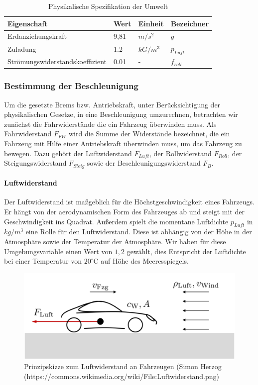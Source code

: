 \documentclass[12pt,a4paper,bibliography=totocnumbered,listof=totocnumbered, abstracton]{scrartcl}
\theoremstyle{Umgebung}
\begin{document}
\begin{table}[]
	\centering
	\caption{Physikalische Spezifikation der Umwelt}
	\label{table:physics}
	\begin{tabular}{@{}llll@{}}
		\toprule
		Eigenschaft                     & Wert & Einheit & Bezeichner           \\ \midrule
		Erdanziehungskraft	            & 9,81 & $m/s^2$    & $g$            \\
		Zuladung                        & 1.2  & $kG/m^3$   & $p_{Luft}$             \\
		Strömungswiderstandskoeffizient & 0.01 & -       & $f_{roll}$                 \\ \bottomrule       
	\end{tabular}
\end{table}

\subsubsection{Bestimmung der Beschleunigung}

Um die gesetzte Brems bzw. Antriebskraft, unter Berücksichtigung der physikalischen Gesetze, in eine Beschleunigung umzurechnen, betrachten wir zunächst die Fahrwiderstände die ein Fahrzeug überwinden muss. Als Fahrwiderstand $F_{FW}$ wird die Summe der Widerstände bezeichnet, die ein Fahrzeug mit Hilfe einer Antriebskraft überwinden muss, um das Fahrzeug zu bewegen. Dazu gehört der Luftwiderstand $F_{Luft}$, der Rollwiderstand $F_{Roll}$, der Steigungswiderstand $F_{Steig}$ sowie der Beschleunigungswiderstand $F_{B}$.

\paragraph{Luftwiderstand}

Der Luftwiderstand ist maßgeblich für die Höchstgeschwindigkeit eines Fahrzeugs. Er hängt von der aerodynamischen Form des Fahrzeuges ab und steigt mit der Geschwindigkeit ins Quadrat. Außerdem spielt die momentane Luftdichte $p_{Luft}$ in $kg/m^3$ eine Rolle für den Luftwiderstand. Diese ist abhängig von der Höhe in der Atmosphäre sowie der Temperatur der Atmosphäre.  Wir haben für diese Umgebungsvariable einen Wert von $1,2$ gewählt, dies Entspricht der Luftdichte bei einer Temperatur von $20^\circ\text{C}$ auf Höhe des Meeresspiegels.

\begin{figure}
	\centering
	\includegraphics[width=0.7\linewidth]{img/practical/Luftwiderstand}
	\caption{Prinzipskizze zum Luftwiderstand an Fahrzeugen (Simon Herzog (https://commons.wikimedia.org/wiki/File:Luftwiderstand.png)}
	\label{fig:luftwiderstand}
\end{figure}
\end{document}
